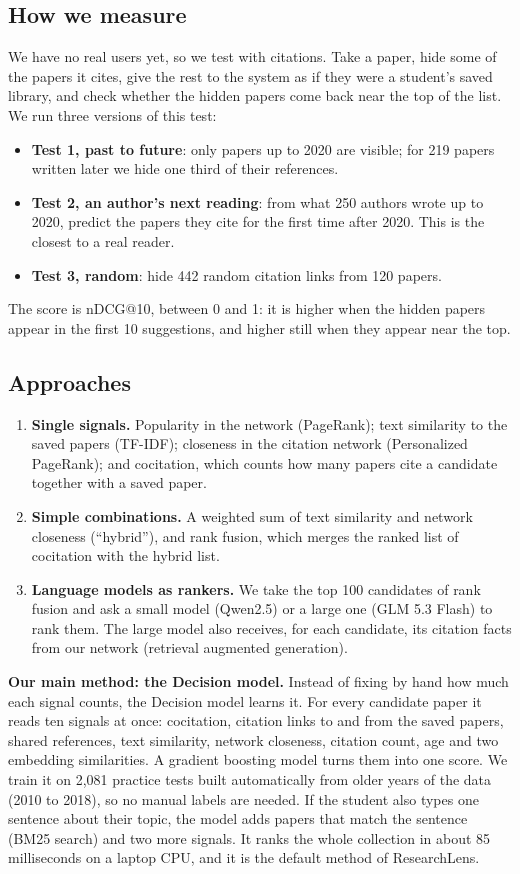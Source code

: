 \documentclass[11pt,a4paper]{article}
\begin{document}
\subsection*{How we measure}
We have no real users yet, so we test with citations. Take a paper, hide some of the papers it cites, give the rest to the system as if they were a student's saved library, and check whether the hidden papers come back near the top of the list. We run three versions of this test:
\begin{itemize}
\item \textbf{Test 1, past to future}: only papers up to 2020 are visible; for 219 papers written later we hide one third of their references.
\item \textbf{Test 2, an author's next reading}: from what 250 authors wrote up to 2020, predict the papers they cite for the first time after 2020. This is the closest to a real reader.
\item \textbf{Test 3, random}: hide 442 random citation links from 120 papers.
\end{itemize}
The score is nDCG@10, between 0 and 1: it is higher when the hidden papers appear in the first 10 suggestions, and higher still when they appear near the top.

\subsection*{Approaches}
\begin{enumerate}
\item \textbf{Single signals.} Popularity in the network (PageRank); text similarity to the saved papers (TF-IDF); closeness in the citation network (Personalized PageRank); and cocitation, which counts how many papers cite a candidate together with a saved paper.
\item \textbf{Simple combinations.} A weighted sum of text similarity and network closeness (``hybrid''), and rank fusion, which merges the ranked list of cocitation with the hybrid list.
\item \textbf{Language models as rankers.} We take the top 100 candidates of rank fusion and ask a small model (Qwen2.5) or a large one (GLM 5.3 Flash) to rank them. The large model also receives, for each candidate, its citation facts from our network (retrieval augmented generation).
\end{enumerate}

\textbf{Our main method: the Decision model.} Instead of fixing by hand how much each signal counts, the Decision model learns it. For every candidate paper it reads ten signals at once: cocitation, citation links to and from the saved papers, shared references, text similarity, network closeness, citation count, age and two embedding similarities. A gradient boosting model turns them into one score. We train it on 2,081 practice tests built automatically from older years of the data (2010 to 2018), so no manual labels are needed. If the student also types one sentence about their topic, the model adds papers that match the sentence (BM25 search) and two more signals. It ranks the whole collection in about 85 milliseconds on a laptop CPU, and it is the default method of ResearchLens.
\end{document}
